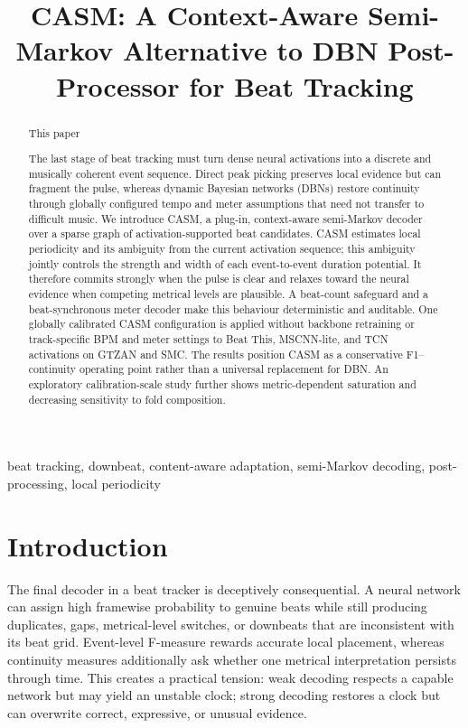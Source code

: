 \documentclass{article}
\title{CASM: A Context-Aware Semi-Markov Alternative to DBN Post-Processor for Beat Tracking}
\begin{document}
\ninept
\maketitle

\begin{abstract}
This paper 

The last stage of beat tracking must turn dense neural activations into a discrete and musically coherent event sequence. Direct peak picking preserves local evidence but can fragment the pulse, whereas dynamic Bayesian networks (DBNs) restore continuity through globally configured tempo and meter assumptions that need not transfer to difficult music. We introduce CASM, a plug-in, context-aware semi-Markov decoder over a sparse graph of activation-supported beat candidates. CASM estimates local periodicity and its ambiguity from the current activation sequence; this ambiguity jointly controls the strength and width of each event-to-event duration potential. It therefore commits strongly when the pulse is clear and relaxes toward the neural evidence when competing metrical levels are plausible. A beat-count safeguard and a beat-synchronous meter decoder make this behaviour deterministic and auditable. One globally calibrated CASM configuration is applied without backbone retraining or track-specific BPM and meter settings to Beat This, MSCNN-lite, and TCN activations on GTZAN and SMC. The results position CASM as a conservative F1--continuity operating point rather than a universal replacement for DBN. An exploratory calibration-scale study further shows metric-dependent saturation and decreasing sensitivity to fold composition.
\end{abstract}

\begin{keywords}
beat tracking, downbeat, content-aware adaptation, semi-Markov decoding, post-processing, local periodicity
\end{keywords}

\section{Introduction}
\label{sec:intro}

The final decoder in a beat tracker is deceptively consequential. A neural network can assign high framewise probability to genuine beats while still producing duplicates, gaps, metrical-level switches, or downbeats that are inconsistent with its beat grid. Event-level F-measure rewards accurate local placement, whereas continuity measures additionally ask whether one metrical interpretation persists through time. This creates a practical tension: weak decoding respects a capable network but may yield an unstable clock; strong decoding restores a clock but can overwrite correct, expressive, or unusual evidence.
\end{document}
